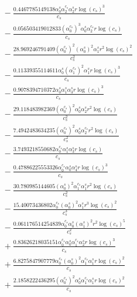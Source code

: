 \documentclass[10pt]{article}
\begin{document}
\begin{align*}
&{}  - \frac{0.4467785149138 \alpha_{0}^s \alpha_{2}^{c_s} \alpha_{2}^s r \log{\left(c_{s} \right)}^{3}}{c_{s}} \\
&{}  - \frac{0.056503419012833 \left(\alpha_{0}^{c_s}\right)^{3} \alpha_{0}^s \alpha_{2}^{c_s} r \log{\left(c_{s} \right)}}{c_{s}} \\
&{}  - \frac{28.969246791409 \left(\alpha_{0}^{c_s}\right)^{2} \left(\alpha_{0}^s\right)^{2} \alpha_{1}^s r^{2} \log{\left(c_{s} \right)}^{2}}{c_{s}^{2}} \\
&{}  - \frac{0.11339355114611 \alpha_{0}^s \left(\alpha_{1}^{c_s}\right)^{2} \alpha_{1}^s r \log{\left(c_{s} \right)}^{3}}{c_{s}} \\
&{}  - \frac{0.9078394710372 \alpha_{0}^s \alpha_{1}^s \alpha_{3}^s r \log{\left(c_{s} \right)}^{3}}{c_{s}} \\
&{}  - \frac{29.118483982369 \left(\alpha_{0}^{c_s}\right)^{2} \alpha_{0}^s \alpha_{2}^s r^{2} \log{\left(c_{s} \right)}}{c_{s}^{2}} \\
&{}  - \frac{7.4942483634235 \left(\alpha_{0}^{c_s}\right)^{2} \alpha_{0}^s \alpha_{2}^{c_s} r^{2} \log{\left(c_{s} \right)}}{c_{s}^{2}} \\
&{}  - \frac{3.7493218550682 \alpha_{0}^{c_s} \alpha_{1}^s \alpha_{3}^s r \log{\left(c_{s} \right)}}{c_{s}} \\
&{}  - \frac{0.47886225553326 \alpha_{0}^{c_s} \alpha_{0}^s \alpha_{4}^s r \log{\left(c_{s} \right)}^{3}}{c_{s}} \\
&{}  - \frac{30.780985144605 \left(\alpha_{0}^s\right)^{2} \alpha_{1}^{c_s} \alpha_{1}^s r^{2} \log{\left(c_{s} \right)}}{c_{s}^{2}} \\
&{}  - \frac{15.40073436802 \alpha_{0}^{c_s} \left(\alpha_{0}^s\right)^{2} \alpha_{1}^s r^{3} \log{\left(c_{s} \right)}^{2}}{c_{s}^{3}} \\
&{}  - \frac{0.061176514254839 \alpha_{0}^{c_s} \alpha_{0}^s \left(\alpha_{1}^s\right)^{2} r^{2} \log{\left(c_{s} \right)}^{5}}{c_{s}^{2}} \\
&{}  + \frac{0.83626218035151 \alpha_{0}^{c_s} \alpha_{0}^s \alpha_{1}^{c_s} \alpha_{2}^s r \log{\left(c_{s} \right)}^{3}}{c_{s}} \\
&{}  + \frac{6.8275847907779 \alpha_{0}^{c_s} \left(\alpha_{0}^s\right)^{2} \alpha_{1}^{c_s} \alpha_{1}^s r \log{\left(c_{s} \right)}^{2}}{c_{s}} \\
&{}  + \frac{2.1858222436295 \left(\alpha_{0}^{c_s}\right)^{2} \alpha_{0}^s \alpha_{1}^{c_s} \alpha_{1}^s r \log{\left(c_{s} \right)}^{2}}{c_{s}} \\

\end{align*}
\end{document}
